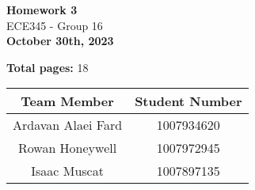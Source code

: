\begin{titlepage}
    \begin{center}
    {\fontsize{40}{48}\selectfont \bfseries Homework 3} 
    \\\vspace{20pt}
    {\LARGE ECE345 - Group 16} \\
    \vspace{20pt}
    \textbf{October 30th, 2023}
    \vspace{8pt}

    \textbf{Total pages:} 18
    \end{center}

    \begin{table}[!ht]
        \centering
        \begin{tabular}{|c|c|}
        \hline
            \textbf{Team Member} & \textbf{Student Number} \\ \hline
            Ardavan Alaei Fard & 1007934620 \\ \hline
            Rowan Honeywell & 1007972945 \\ \hline
            Isaac Muscat & 1007897135 \\ \hline
        \end{tabular}
    \end{table}
\end{titlepage}